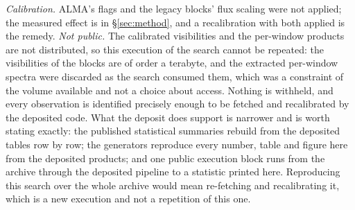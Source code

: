 \emph{Calibration.} ALMA's flags and the legacy blocks' flux scaling were not
applied; the measured effect is in \S\ref{sec:method}, and a recalibration with
both applied is the remedy. \emph{Not public.} The calibrated visibilities and
the per-window products are not distributed, so this execution of the search cannot be repeated: the
visibilities of the \NEB{} blocks are of order a terabyte, and the extracted
per-window spectra were discarded as the search consumed them, which was a
constraint of the volume available and not a choice about access. Nothing is
withheld, and every observation is identified precisely enough to be fetched
and recalibrated by the deposited code. What the deposit does support is
narrower and is worth stating exactly: the published statistical summaries
rebuild from the deposited tables row by row; the generators reproduce every
number, table and figure here from the deposited products; and one public
execution block runs from the archive through the deposited pipeline to a
statistic printed here. Reproducing this search over the whole archive would
mean re-fetching and recalibrating it, which is a new execution and not a
repetition of this one.
